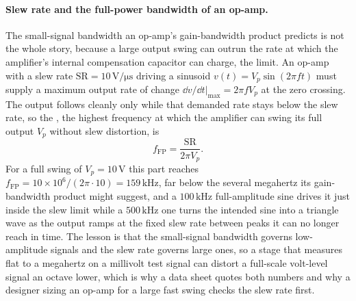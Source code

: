 \paragraph{Slew rate and the full-power bandwidth of an op-amp.}
The small-signal bandwidth an op-amp's gain-bandwidth product predicts is not the
whole story, because a large output swing can outrun the rate at which the
amplifier's internal compensation capacitor can charge, the 
limit. An op-amp with a slew rate $\text{SR} = 10\,\si{\volt}/\si{\micro\second}$
driving a sinusoid $v(t) = V_p\sin(2\pi f t)$ must supply a maximum output rate
of change $\dd v/\dd t|_{\max} = 2\pi f V_p$ at the zero crossing. The output
follows cleanly only while that demanded rate stays below the slew rate, so the
, the highest frequency at which the amplifier can
swing its full output $V_p$ without slew distortion, is
\[
f_{\text{FP}} = \frac{\text{SR}}{2\pi V_p}.
\]
For a full swing of $V_p = 10\,\si{\volt}$ this part reaches $f_{\text{FP}} =
10\times 10^{6}/(2\pi\cdot 10) = 159\,\si{\kilo\hertz}$, far below the several
megahertz its gain-bandwidth product might suggest, and a $100\,\si{\kilo\hertz}$
full-amplitude sine drives it just inside the slew limit while a
$500\,\si{\kilo\hertz}$ one turns the intended sine into a triangle wave as the
output ramps at the fixed slew rate between peaks it can no longer reach in time.
The lesson is that the small-signal bandwidth governs low-amplitude signals and
the slew rate governs large ones, so a stage that measures flat to a megahertz on
a millivolt test signal can distort a full-scale volt-level signal an octave
lower, which is why a data sheet quotes both numbers and why a designer sizing an
op-amp for a large fast swing checks the slew rate first.

